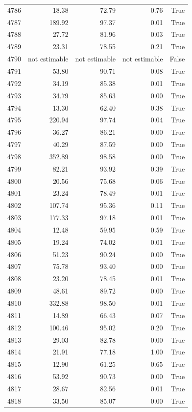 \begin{longtable}{rrrrr}
4786 & 18.38 & 72.79 & 0.76 & True \\
4787 & 189.92 & 97.37 & 0.01 & True \\
4788 & 27.72 & 81.96 & 0.03 & True \\
4789 & 23.31 & 78.55 & 0.21 & True \\
4790 & not estimable & not estimable & not estimable & False \\
4791 & 53.80 & 90.71 & 0.08 & True \\
4792 & 34.19 & 85.38 & 0.01 & True \\
4793 & 34.79 & 85.63 & 0.00 & True \\
4794 & 13.30 & 62.40 & 0.38 & True \\
4795 & 220.94 & 97.74 & 0.04 & True \\
4796 & 36.27 & 86.21 & 0.00 & True \\
4797 & 40.29 & 87.59 & 0.00 & True \\
4798 & 352.89 & 98.58 & 0.00 & True \\
4799 & 82.21 & 93.92 & 0.39 & True \\
4800 & 20.56 & 75.68 & 0.06 & True \\
4801 & 23.24 & 78.49 & 0.01 & True \\
4802 & 107.74 & 95.36 & 0.11 & True \\
4803 & 177.33 & 97.18 & 0.01 & True \\
4804 & 12.48 & 59.95 & 0.59 & True \\
4805 & 19.24 & 74.02 & 0.01 & True \\
4806 & 51.23 & 90.24 & 0.00 & True \\
4807 & 75.78 & 93.40 & 0.00 & True \\
4808 & 23.20 & 78.45 & 0.01 & True \\
4809 & 48.61 & 89.72 & 0.00 & True \\
4810 & 332.88 & 98.50 & 0.01 & True \\
4811 & 14.89 & 66.43 & 0.07 & True \\
4812 & 100.46 & 95.02 & 0.20 & True \\
4813 & 29.03 & 82.78 & 0.00 & True \\
4814 & 21.91 & 77.18 & 1.00 & True \\
4815 & 12.90 & 61.25 & 0.65 & True \\
4816 & 53.92 & 90.73 & 0.00 & True \\
4817 & 28.67 & 82.56 & 0.01 & True \\
4818 & 33.50 & 85.07 & 0.00 & True \\

\end{longtable}
